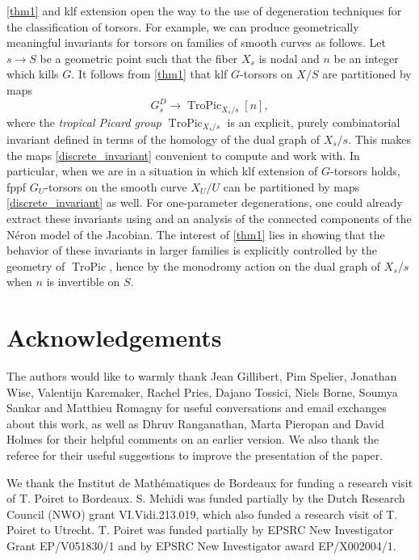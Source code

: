 \documentclass[a4paper,11pt]{amsart} %
\DeclareRobustCommand{\SkipTocEntry}[5]{}
\numberwithin{equation}{subsection}
\newcommand{\on}[1]{\operatorname{#1}}
\theoremstyle{definition}
\theoremstyle{plain}%
\theoremstyle{remark}
\begin{document}
\ref{thm1} and klf extension open the way to the use of degeneration techniques for the classification of torsors. For example, we can produce geometrically meaningful invariants for torsors on families of smooth curves as follows. Let $s \to S$ be a geometric point such that the fiber $X_s$ is nodal and $n$ be an integer which kills $G$. It follows from \ref{thm1} that klf $G$-torsors on $X/S$ are partitioned by maps
\begin{equation}\label{discrete_invariant}
    G_s^D \to \on{TroPic}_{X_s/s}[n],
\end{equation}
where the \emph{tropical Picard group} $\on{TroPic}_{X_s/s}$ is an explicit, purely combinatorial invariant defined in terms of the homology of the dual graph of $X_s/s$. This makes the maps \ref{discrete_invariant} convenient to compute and work with. In particular, when we are in a situation in which klf extension of $G$-torsors holds, fppf $G_U$-torsors on the smooth curve $X_U/U$ can be partitioned by maps \ref{discrete_invariant} as well. For one-parameter degenerations, one could already extract these invariants using \cite[Corollary 1.10]{Sara} and an analysis of the connected components of the N\'eron model of the Jacobian. The interest of \ref{thm1} lies in showing that the behavior of these invariants in larger families is explicitly controlled by the geometry of $\on{TroPic}$, hence by the monodromy action on the dual graph of $X_s/s$ when $n$ is invertible on $S$.\\

\section*{Acknowledgements} 

The authors would like to warmly thank Jean Gillibert, Pim Spelier, Jonathan Wise, Valentijn Karemaker, Rachel Pries, Dajano Tossici, Niels Borne, Soumya Sankar and Matthieu Romagny for useful conversations and email exchanges about this work, as well as Dhruv Ranganathan, Marta Pieropan and David Holmes for their helpful comments on an earlier version. We also thank the referee for their useful suggestions to improve the presentation of the paper.

We thank the Institut de Math\'ematiques de Bordeaux for funding a research visit of T. Poiret to Bordeaux. S. Mehidi was funded partially by the Dutch Research Council (NWO) grant VI.Vidi.213.019, which also funded a research visit of T. Poiret to Utrecht. T. Poiret was funded partially by EPSRC New Investigator Grant EP/V051830/1 and by EPSRC New Investigator award EP/X002004/1.
\end{document}
